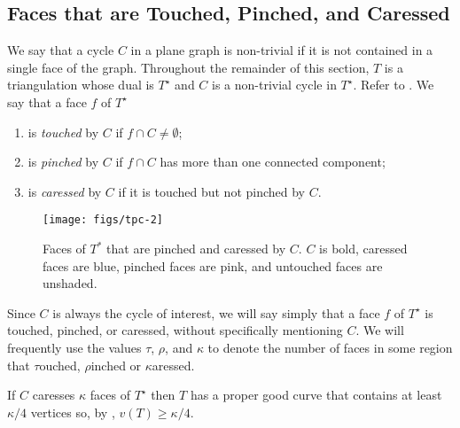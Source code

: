 \documentclass{patmorin}
\newcommand{\dual}[1]{{#1}^\star}
\begin{document}
\subsection{Faces that are Touched, Pinched, and Caressed}

We say that a cycle $C$ in a plane graph is non-trivial if it is not
contained in a single face of the graph.  Throughout the remainder of
this section, $T$ is a triangulation whose dual is $\dual{T}$ and $C$
is a non-trivial cycle in $\dual{T}$.  Refer to .
We say that a face $f$ of $\dual{T}$ 
\begin{enumerate}
  \item is \emph{touched} by $C$ if $f\cap C\neq \emptyset$;
  \item is \emph{pinched} by $C$ if $f\cap C$ has more than one connected component;
  \item is \emph{caressed} by $C$ if it is touched but not pinched by $C$.
\end{enumerate}

\begin{figure}
\begin{center}
	  \texttt{[image: figs/tpc-2]}
\end{center}
	  \caption{Faces of $T^*$ that are pinched and caressed by $C$. $C$ is bold, caressed faces are blue, pinched faces are pink, and untouched faces are unshaded.}
\end{figure}


Since $C$ is always the cycle of interest, we will say simply that a face
$f$ of $\dual{T}$ is touched, pinched, or caressed, without specifically
mentioning $C$.  We will frequently use the values $\tau$, $\rho$, and
$\kappa$ to denote the number of faces in some region that $\tau$ouched,
$\rho$inched or $\kappa$aressed.

\begin{lem}
   If $C$ caresses $\kappa$ faces of $\dual{T}$ then $T$ has a proper good
	curve that contains at least $\kappa/4$ vertices so, by , $v(T)\ge \kappa/4$.
\end{lem}
\end{document}
